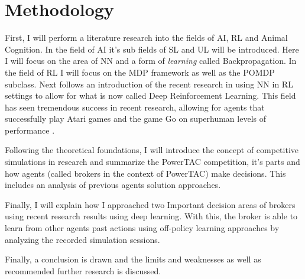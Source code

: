 \section{Methodology}
First, I will perform a literature research into the fields of \ac{AI}, \ac{RL} and Animal Cognition. In the field of AI
it's sub fields of \ac {SL}  and \ac {UL}  will be introduced. Here I will focus on the area of \ac{NN} and a form of
\emph{learning}  called Backpropagation. In the field of \ac{RL} I will focus on the \ac{MDP} framework as well as the
\ac{POMDP} subclass.  Next follows an introduction of the recent research in using \ac{NN} in \ac{RL} settings to allow
for what is now called Deep Reinforcement Learning. This field has seen tremendous success in recent research, allowing
for agents that successfully play Atari games and the game Go on superhuman levels of performance 
\citep{proximalpolicyopt, silver2016mastering}.


Following the theoretical foundations,  I will introduce the concept of competitive simulations in research
and summarize the \ac{PowerTAC} competition, it's parts and how agents (called brokers in the context of \ac{PowerTAC})
make decisions. This includes an analysis of previous agents solution approaches. 

Finally, I will explain how I approached two Important decision areas of brokers using recent research results using
deep learning. With this, the broker is able to learn from other agents past actions using off-policy learning
approaches by analyzing the recorded simulation sessions. 

Finally, a conclusion is drawn and the limits and weaknesses as well as recommended further research is discussed.
